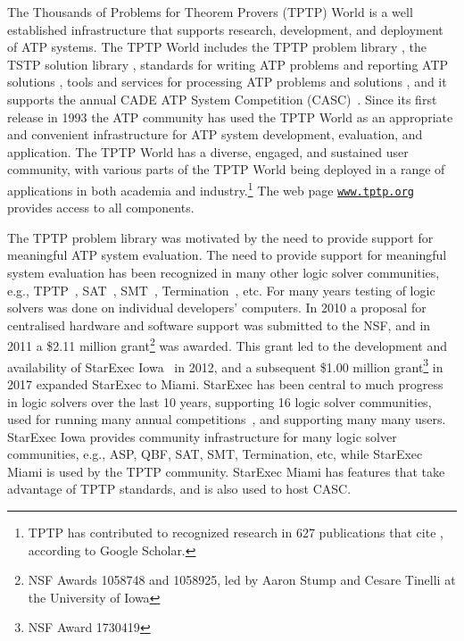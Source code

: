 \documentclass{easychair}
\begin{document}
The Thousands of Problems for Theorem Provers (TPTP) World \cite{Sut24} is a well established 
infrastructure that supports research, development, and deployment of ATP systems.
The TPTP World includes 
the TPTP problem library \cite{Sut17},
the TSTP solution library \cite{Sut10},
standards for writing ATP problems and reporting ATP solutions \cite{SS+06,Sut08-KEAPPA},
tools and services for processing ATP problems and solutions \cite{Sut10},
and it supports the annual CADE ATP System Competition (CASC)~\cite{Sut16}.
Since its first release in 1993 the ATP community has used the TPTP World as an appropriate and 
convenient infrastructure for ATP system development, evaluation, and application.
The TPTP World has a diverse, engaged, and sustained user community, with various parts of the 
TPTP World being deployed in a range of applications in both academia and industry.\footnote{%
TPTP has contributed to recognized research in 627 publications that cite \cite{Sut17},
according to Google Scholar.}
The web page \href{https://www.tptp.org}{\tt www.tptp.org} provides access to all components.

The TPTP problem library was motivated by the need to provide support for meaningful ATP system 
evaluation.
The need to provide support for meaningful system evaluation has been recognized in many other 
logic solver communities, e.g., TPTP~\cite{SS01}, SAT~\cite{HS00-SATLIB}, SMT~\cite{CSW15},
Termination~\cite{MZ07}, etc.
For many years testing of logic solvers was done on individual developers' computers. 
In 2010 a proposal for centralised hardware and software support was submitted to the NSF,
and in 2011 a \$2.11 million grant\footnote{%
NSF Awards 1058748 and 1058925, led by Aaron Stump and Cesare Tinelli at the University of Iowa} 
was awarded.
This grant led to the development and availability of StarExec Iowa~\cite{SST14} in 2012,
and a subsequent \$1.00 million grant\footnote{%
NSF Award 1730419} in 2017 expanded StarExec to Miami.
StarExec has been central to much progress in logic solvers over the last 10 years, supporting
16 logic solver communities, used for running many annual competitions~\cite{BB+19}, and 
supporting many many users.
StarExec Iowa provides community infrastructure for many logic solver communities,
e.g., ASP, QBF, SAT, SMT, Termination, etc, while StarExec Miami is used by the TPTP community.
StarExec Miami has features that take advantage of TPTP standards, and is also used to host CASC.
\end{document}
